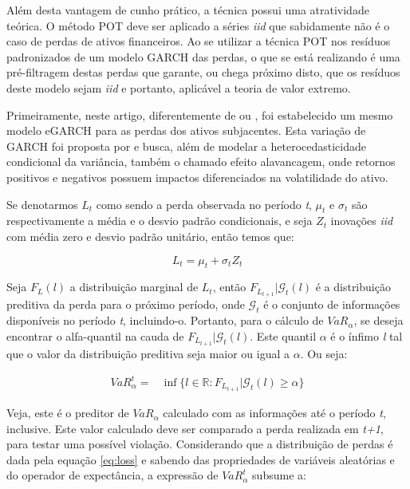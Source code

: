 \documentclass[review]{elsarticle}
\theoremstyle{definition}
\begin{document}
Além desta vantagem de cunho prático, a técnica possui uma atratividade teórica. O método POT deve ser aplicado a séries \emph{iid} que sabidamente não é o caso de perdas de ativos financeiros. Ao se utilizar a técnica POT nos resíduos padronizados de um modelo GARCH das perdas, o que se está realizando é uma pré-filtragem destas perdas que garante, ou chega próximo disto, que os resíduos deste modelo sejam \emph{iid} e portanto, aplicável a teoria de valor extremo. 

Primeiramente, neste artigo, diferentemente de \cite{McNeil2000} ou \cite{Karmakar2014}, foi estabelecido um mesmo modelo eGARCH para as perdas dos ativos subjacentes. Esta variação de GARCH foi proposta por \cite{Nelson1991} e busca, além de modelar a heterocedasticidade condicional da variância, também o chamado efeito alavancagem, onde retornos positivos e negativos possuem impactos diferenciados na volatilidade do ativo. 

Se denotarmos $L_t$ como sendo a perda observada no período \emph{t}, $\mu_t$ e $\sigma_t$ são respectivamente a média e o desvio padrão condicionais, e seja $Z_t$ inovações \emph{iid} com média zero e desvio padrão unitário, então temos que:

\begin{equation}
\label{eq:loss}
L_t=\mu_t+\sigma_t Z_t
\end{equation}

Seja $F_L(l)$ a distribuição marginal de $L_t$, então $F_{L_{t+1}} | \mathcal{G}_t(l)$ é a distribuição preditiva da perda para o próximo período, onde $\mathcal{G}_t$ é o conjunto de informações disponíveis no período \emph{t}, incluindo-o. Portanto, para o cálculo de $VaR_\alpha$, se deseja encontrar o alfa-quantil na cauda de $F_{L_{t+1}} | \mathcal{G}_t(l)$. Este quantil $\alpha$ é o ínfimo \emph{l} tal que o valor da distribuição preditiva seja maior ou igual a $\alpha$. Ou seja:

\begin{align}
VaR_\alpha^t=&\inf\{l \in \mathbb{R}: F_{L_{t+1}} | \mathcal{G}_t(l) \geq \alpha\}
\end{align}

Veja, este é o preditor de $VaR_\alpha$ calculado com as informações até o período \emph{t}, inclusive. Este valor calculado deve ser comparado a perda realizada em \emph{t+1}, para testar uma possível violação.
Considerando que a distribuição de perdas é dada pela equação \eqref{eq:loss} e sabendo das propriedades de variáveis aleatórias e do operador de expectância, a expressão de $VaR_\alpha^t$ subsume a:
\end{document}
